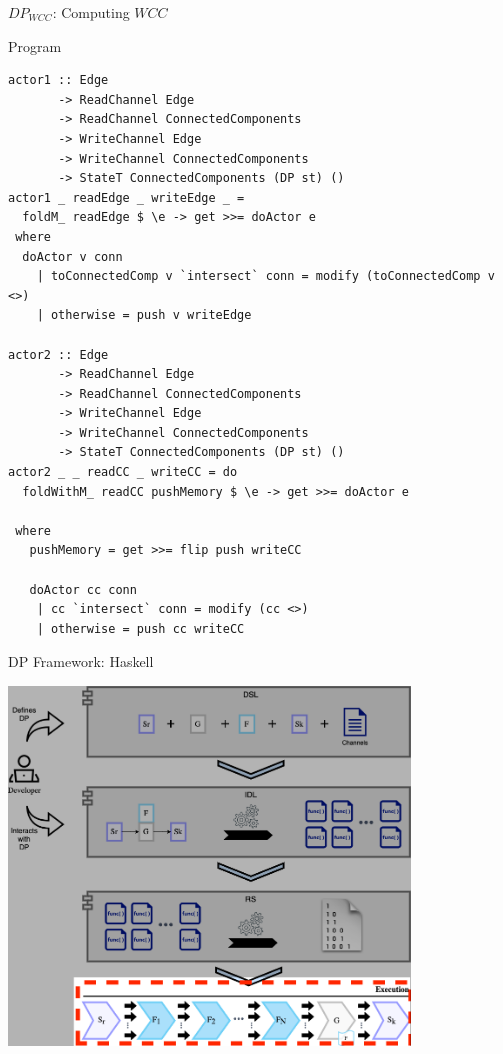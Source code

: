 \documentclass{beamer}
\begin{document}
  \begin{frame}[fragile]{$DP_{WCC}$: Computing $WCC$}
    \begin{block}{Program}
      \begin{verbatim}      
actor1 :: Edge
       -> ReadChannel Edge
       -> ReadChannel ConnectedComponents
       -> WriteChannel Edge
       -> WriteChannel ConnectedComponents
       -> StateT ConnectedComponents (DP st) ()
actor1 _ readEdge _ writeEdge _ = 
  foldM_ readEdge $ \e -> get >>= doActor e
 where
  doActor v conn
    | toConnectedComp v `intersect` conn = modify (toConnectedComp v <>)
    | otherwise = push v writeEdge

actor2 :: Edge
       -> ReadChannel Edge
       -> ReadChannel ConnectedComponents
       -> WriteChannel Edge
       -> WriteChannel ConnectedComponents
       -> StateT ConnectedComponents (DP st) ()
actor2 _ _ readCC _ writeCC = do 
  foldWithM_ readCC pushMemory $ \e -> get >>= doActor e

 where
   pushMemory = get >>= flip push writeCC

   doActor cc conn
    | cc `intersect` conn = modify (cc <>)
    | otherwise = push cc writeCC
      \end{verbatim}
    \end{block}
  \end{frame}

  \begin{frame}[fragile]{DP Framework: Haskell}
    \begin{center}
      \includegraphics[width = 0.8\textwidth, height = 0.8\textheight]{dpf_haskell_v3-4}
    \end{center}
  \end{frame}
\end{document}
